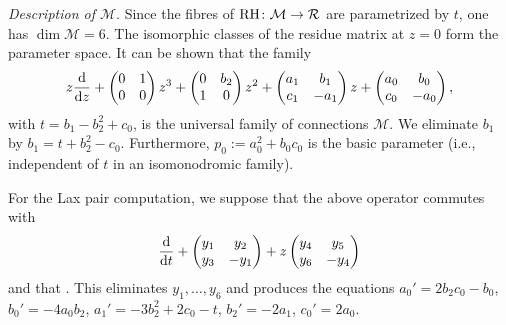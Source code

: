 \documentclass[10pt,a4paper]{amsart}
\numberwithin{equation}{section}
\begin{document}
 {\it Description of $\mathcal{M}$}. Since the fibres of ${\rm RH}\colon\mathcal{M}\rightarrow \mathcal{R}$ are
parametrized by $t$, one has $\dim \mathcal{M}=6$. The isomorphic classes of the residue matrix at $z=0$ form the parameter space.
It can be shown that the family
 \[ z\frac{{\rm d}}{{\rm d}z}+ \begin{pmatrix}0 & 1\\0& 0\end{pmatrix} z^3+
\begin{pmatrix} 0 &b_2\\1&0\end{pmatrix}z^2+
\begin{pmatrix} a_1 &b_1\\ c_1& -a_1\end{pmatrix} z+ \begin{pmatrix}a_0 & b_0 \\c_0& -a_0\end{pmatrix},\]
with $t=b_1-b_2^2+c_0$, is the universal family of connections $\mathcal{M}$. We eliminate $b_1$ by $b_1=t+b_2^2-c_0$.
Furthermore, $p_0:=a_0^2+b_0c_0$ is the basic parameter (i.e., independent of $t$ in an isomonodromic family).

For the Lax pair computation, we suppose that the above operator commutes with
\[
\frac{{\rm d}}{{\rm d}t}+\begin{pmatrix} y_1&y_2\\y_3& -y_1 \end{pmatrix}+z\begin{pmatrix} y_4& y_5\\y_6& -y_4 \end{pmatrix}
\]
 and that .
This eliminates $y_1,\dots ,y_6$ and produces the equations
$a_0'=2b_2c_0-b_0$, $ b_0'=-4a_0b_2$, $ a_1'=-3b_2^2+2c_0-t$, $ b_2'=-2a_1$, $ c_0'=2a_0$.
\end{document}
